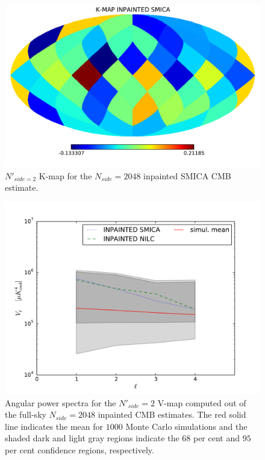 \begin{figure}
\centering
\includegraphics[width=\textwidth]{figures/chapter-vsk/kmap-inpainted-smica.pdf}
\caption{$N'_{side = 2}$ K-map for the $N_{side} = 2048$ inpainted SMICA CMB estimate.}
\label{Fig:3b}
\end{figure}


\begin{figure}
\centering
\includegraphics[width=\textwidth]{figures/chapter-vsk/Inp_Vl.pdf}
\caption{Angular power spectra for the $N'_{side} = 2$ V-map computed out of the full-sky $N_{side} = 2048$ inpainted CMB estimates. The red solid line indicates the mean for $1000$ Monte Carlo simulations and the shaded dark and light gray regions indicate the $68$ per cent and $95$ per cent confidence regions, respectively.}
\label{Fig:1}
\end{figure}

